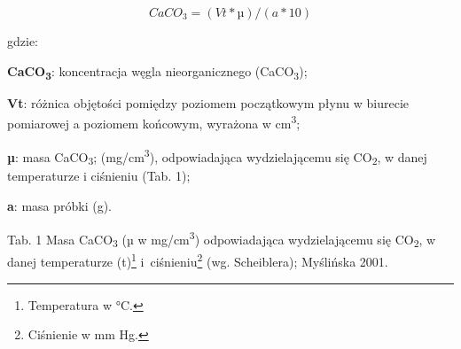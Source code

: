 \documentclass[
  letterpaper,
  DIV=11,
  numbers=noendperiod]{scrreprt}
\begin{document}
\[
CaCO_3 = (Vt * µ) / (a * 10)
\]

gdzie:

\textbf{CaCO\textsubscript{3}}: koncentracja węgla nieorganicznego
(CaCO\textsubscript{3});

\textbf{Vt}: różnica objętości pomiędzy poziomem początkowym płynu w
biurecie pomiarowej a poziomem końcowym, wyrażona w
cm\textsuperscript{3};

\textbf{µ}: masa CaCO\textsubscript{3}; (mg/cm\textsuperscript{3}),
odpowiadająca wydzielającemu się CO\textsubscript{2}, w danej
temperaturze i ciśnieniu (Tab. 1);

\textbf{a}: masa próbki (g).

Tab. 1 Masa CaCO\textsubscript{3} (µ w mg/cm\textsuperscript{3})
odpowiadająca wydzielającemu się CO\textsubscript{2}, w danej
temperaturze (t)\footnote{Temperatura w °C.} i~ciśnieniu\footnote{Ciśnienie
  w mm Hg.} (wg. Scheiblera); Myślińska 2001.
\end{document}
